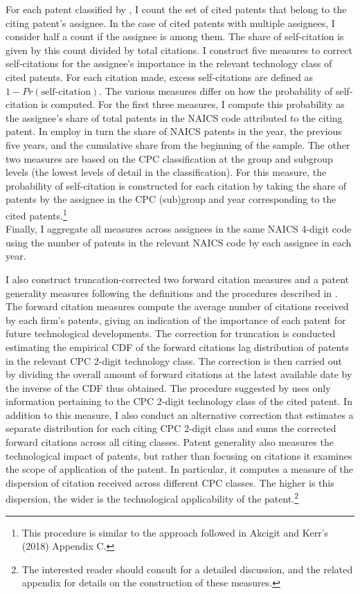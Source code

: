 For each patent classified by \citet{goldschlagAlgorithmicLinksProbabilities2016},
I count the set of cited patents that belong to the citing patent's
assignee. In the case of cited patents with multiple assignees, I
consider half a count if the assignee is among them. The share of
self-citation is given by this count divided by total citations. I
construct five measures to correct self-citations for the assignee's
importance in the relevant technology class of cited patents. For
each citation made, excess self-citations are defined as $1-Pr\left(\text{self-citation}\right)$.
The various measures differ on how the probability of self-citation
is computed. For the first three measures, I compute this probability
as the assignee's share of total patents in the NAICS code attributed
to the citing patent. In employ in turn the share of NAICS patents
in the year, the previous five years, and the cumulative share from
the beginning of the sample. The other two measures are based on the
CPC classification at the group and subgroup levels (the lowest levels
of detail in the classification). For this measure, the probability
of self-citation is constructed for each citation by taking the share
of patents by the assignee in the CPC (sub)group and year corresponding
to the cited patents.\footnote{This procedure is similar to the approach followed in Akcigit and
Kerr's (2018) Appendix C.} \\
Finally, I aggregate all measures across assignees in the same NAICS
4-digit code using the number of patents in the relevant NAICS code
by each assignee in each year.

I also construct truncation-corrected two forward citation measures
and a patent generality measures following the definitions and the
procedures described in \citet{hallNBERPatentCitation2001}. The forward
citation measures compute the average number of citations received
by each firm's patents, giving an indication of the importance of
each patent for future technological developments. The correction
for truncation is conducted estimating the empirical CDF of the forward
citations lag distribution of patents in the relevant CPC 2-digit
technology class. The correction is then carried out by dividing the
overall amount of forward citations at the latest available date by
the inverse of the CDF thus obtained. The procedure suggested by \citet{hallNBERPatentCitation2001}
uses only information pertaining to the CPC 2-digit technology class
of the cited patent. In addition to this measure, I also conduct an
alternative correction that estimates a separate distribution for
each citing CPC 2-digit class and sums the corrected forward citations
across all citing classes. Patent generality also measures the technological
impact of patents, but rather than focusing on citations it examines
the scope of application of the patent. In particular, it computes
a measure of the dispersion of citation received across different
CPC classes. The higher is this dispersion, the wider is the technological
applicability of the patent.\footnote{The interested reader should consult \citet{acemogluRadicalIncrementalInnovationForthcoming}
for a detailed discussion, and the related appendix for details on
the construction of these measures. }

